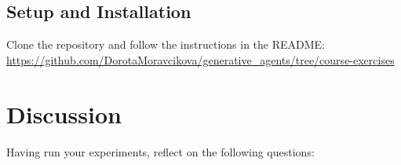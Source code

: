\subsection{Setup and Installation}

Clone the repository and follow the instructions in the README:\\
\url{https://github.com/DorotaMoravcikova/generative_agents/tree/course-exercises}

\section{Discussion}

Having run your experiments, reflect on the following questions:

